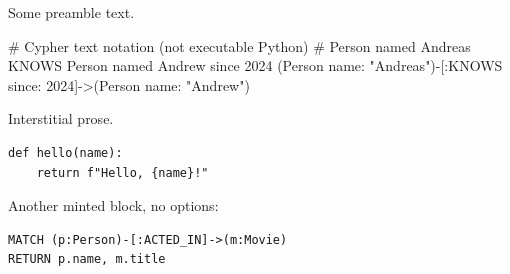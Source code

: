 Some preamble text.

\begin{pycode}
# Cypher text notation (not executable Python)
# Person named Andreas KNOWS Person named Andrew since 2024
(Person name: "Andreas")-[:KNOWS since: 2024]->(Person name: "Andrew")
\end{pycode}

Interstitial prose.

\begin{verbatim}
def hello(name):
    return f"Hello, {name}!"
\end{verbatim}

Another minted block, no options:

\begin{verbatim}
MATCH (p:Person)-[:ACTED_IN]->(m:Movie)
RETURN p.name, m.title
\end{verbatim}
